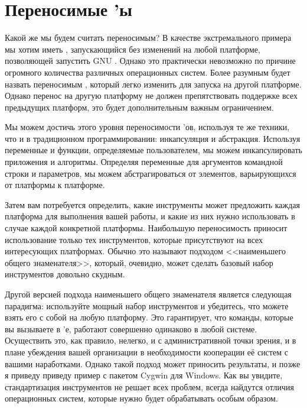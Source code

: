 \chapter{Переносимые \Makefile{}'ы}
\label{chap:portable_makefiles}

Какой же \Makefile{} мы будем считать переносимым? В качестве
экстремального примера мы хотим иметь \Makefile{}, запускающийся без
изменений на любой платформе, позволяющей запустить GNU \GNUmake{}.
Однако это практически невозможно по причине огромного количества
различных операционных систем. Более разумным будет назвать
переносимым \Makefile{}, который легко изменить для запуска на другой
платформе. Однако перенос на другую платформу не должен препятствовать
поддержке всех предыдущих платформ, это будет дополнительным важным
ограничением.

Мы можем достичь этого уровня переносимости \Makefile{}'ов, используя
те же техники, что и в традиционном программировании: инкапсуляция и
абстракция. Используя переменные и функции, определяемые
пользователем, мы можем инкапсулировать приложения и алгоритмы.
Определяя переменные для аргументов командной строки и параметров, мы
можем абстрагироваться от элементов, варьирующихся от платформы к
платформе.

Затем вам потребуется определить, какие инструменты может предложить
каждая платформа для выполнения вашей работы, и какие из них нужно
использовать в случае каждой конкретной платформы. Наибольшую
переносимость приносит использование только тех инструментов, которые
присутствуют на всех интересующих платформах. Обычно это называют
подходом <<наименьшего общего знаменателя>>, который, очевидно, может
сделать базовый набор инструментов довольно скудным.

Другой версией подхода наименьшего общего знаменателя является
следующая парадигма: используйте мощный набор инструментов и
убедитесь, что можете взять его с собой на любую платформу. Это
гарантирует, что команды, которые вы вызываете в \Makefile{}'е,
работают совершенно одинаково в любой системе. Осуществить это, как
правило, нелегко, и с административной точки зрения, и в плане
убеждения вашей организации в необходимости кооперации её систем с
вашими  наработками. Однако такой подход может приносить результаты, и
позже я приведу приведу пример с пакетом Cygwin для Windows. Как вы
увидите, стандартизация инструментов не решает всех проблем, всегда
найдутся отличия операционных систем, которые нужно будет обрабатывать
особым образом.


